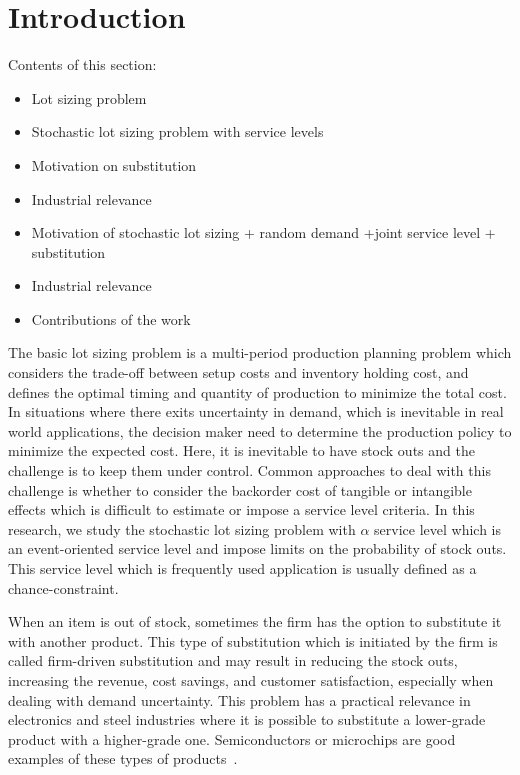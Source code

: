 \documentclass[10pt]{article}
\newcommand{\cred}{\color{red!65!black}}
\begin{document}
\section{Introduction}
{\cred
Contents of this section:

\begin{itemize}
    \item Lot sizing problem 
    \item Stochastic lot sizing problem with service levels
    \item Motivation on substitution
    \item Industrial relevance
    \item Motivation of stochastic lot sizing + random demand +joint service level + substitution 
    \item Industrial relevance
    \item Contributions of the work
\end{itemize}
}
The basic lot sizing problem is a multi-period production planning problem which considers the trade-off between setup costs and inventory holding cost, and defines the optimal timing and quantity of production to minimize the total cost. 
In situations where there exits uncertainty in demand, which is inevitable in real world applications, the decision maker need to determine the production policy to minimize the expected cost. Here, it is inevitable to have stock outs and the challenge is to keep them under control. Common approaches to deal with this challenge is whether to consider the backorder cost of tangible or intangible effects which is difficult to estimate or impose a service level criteria. 
In this research, we study the stochastic lot sizing problem with $\alpha$ service level which is an event-oriented service level and impose limits on the probability of stock outs. This service level which is frequently used application is usually defined as a chance-constraint. 

When an item is out of stock, sometimes the firm has the option to substitute it with another product. This type of substitution which is initiated by the firm is called firm-driven substitution and may result in reducing the stock outs, increasing the revenue, cost savings, and customer satisfaction, especially when dealing with demand uncertainty. This problem has a practical relevance in electronics and steel industries where it is possible to substitute a lower-grade product with a higher-grade one. Semiconductors or microchips are good examples of these types of products~\cite{lang2010efficient}. 
\end{document}
